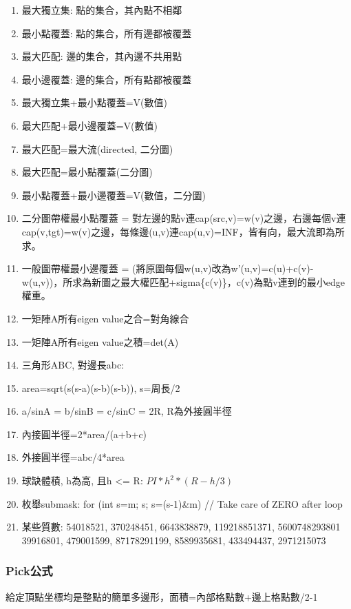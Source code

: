 \begin{enumerate}
\item 最大獨立集: 點的集合，其內點不相鄰
\item 最小點覆蓋: 點的集合，所有邊都被覆蓋
\item 最大匹配: 邊的集合，其內邊不共用點
\item 最小邊覆蓋: 邊的集合，所有點都被覆蓋
\item 最大獨立集+最小點覆蓋=V(數值)
\item 最大匹配+最小邊覆蓋=V(數值)
\item 最大匹配=最大流(directed, 二分圖)
\item 最大匹配=最小點覆蓋(二分圖)
\item 最小點覆蓋+最小邊覆蓋=V(數值，二分圖)
\item 二分圖帶權最小點覆蓋 = 對左邊的點v連cap(src,v)=w(v)之邊，右邊每個v連cap(v,tgt)=w(v)之邊，每條邊(u,v)連cap(u,v)=INF，皆有向，最大流即為所求。
\item 一般圖帶權最小邊覆蓋 = (將原圖每個w(u,v)改為w'(u,v)=c(u)+c(v)-w(u,v))，所求為新圖之最大權匹配+sigma\{c(v)\}，c(v)為點v連到的最小edge權重。

\item 一矩陣A所有eigen value之合=對角線合
\item 一矩陣A所有eigen value之積=det(A)

\item 三角形ABC, 對邊長abc:
\item area=sqrt(s(s-a)(s-b)(s-b)), s=周長/2
\item a/sinA = b/sinB = c/sinC = 2R, R為外接圓半徑
\item 內接圓半徑=2*area/(a+b+c)
\item 外接圓半徑=abc/4*area
\item 球缺體積, h為高, 且h <= R: $PI*h^2*(R-h/3)$
\item 枚舉submask: for (int s=m; s; s=(s-1)\&m) // Take care of ZERO after loop
\item 某些質數:
54018521, 370248451, 6643838879, 119218851371, 5600748293801
39916801, 479001599, 87178291199, 8589935681, 433494437, 2971215073
\end{enumerate}

\subsubsection{Pick公式}
給定頂點坐標均是整點的簡單多邊形，面積=內部格點數+邊上格點數/2-1

